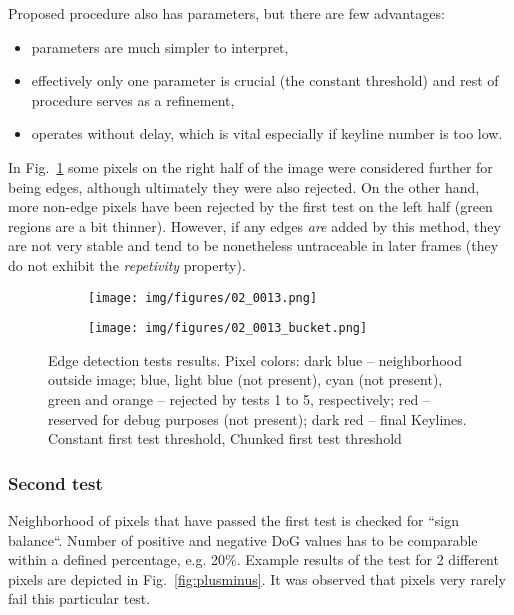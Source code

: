 Proposed procedure also has parameters, but there are few advantages:
\begin{itemize}
	\item parameters are much simpler to interpret,
	\item effectively only one parameter is crucial (the constant threshold) and rest of procedure serves as a refinement,
	\item operates without delay, which is vital especially if keyline number is too low.
\end{itemize}

In Fig.~\ref{fig:bucket} some pixels on the right half of the image were considered further for being edges, although ultimately they were also rejected. On the other hand, more non-edge pixels have been rejected by the first test on the left half (green regions are a bit thinner). However, if any edges \textit{are} added by this method, they are not very stable and tend to be nonetheless untraceable in later frames (they do not exhibit the \textit{repetivity} property).

\begin{figure}[ht]
	\centering
	\begin{subfigure}{1\textwidth}
		\centering
		\centering\texttt{[image: img/figures/02\_0013.png]}
		\subcaption{\label{fig:bucket_a}}
	\end{subfigure}
	\begin{subfigure}{1\textwidth}
		\centering
		\centering\texttt{[image: img/figures/02\_0013\_bucket.png]}
		\subcaption{\label{fig:bucket_b}}
	\end{subfigure}
	\caption{\label{fig:bucket} Edge detection tests results. Pixel colors: dark blue -- neighborhood outside image; blue, light blue (not present), cyan (not present), green and orange -- rejected by tests 1 to 5, respectively; red -- reserved for debug purposes (not present); dark red -- final Keylines. \protect{} Constant first test threshold,
		\protect{} Chunked first test threshold}
\end{figure}

\subsubsection*{Second test}
\label{edge_second}

Neighborhood of pixels that have passed the first test is checked for ``sign balance``. Number of positive and negative DoG values has to be comparable within a defined percentage, e.g. 20\%. Example results of the test for 2 different pixels are depicted in Fig.~\ref{fig:plusminus}. It was observed that pixels very rarely fail this particular test.

